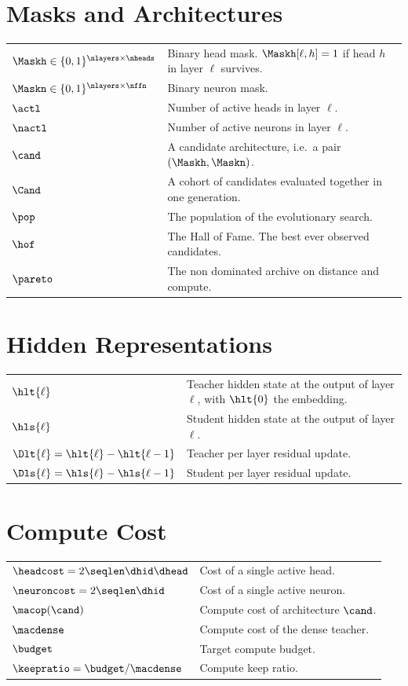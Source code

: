 \section*{Masks and Architectures}
\begin{tabular}{ll}
$\Maskh \in \{0,1\}^{\nlayers \times \nheads}$ & Binary head mask. $\Maskh[\ell, h] = 1$ if head $h$ in layer $\ell$ survives. \\
$\Maskn \in \{0,1\}^{\nlayers \times \nffn}$ & Binary neuron mask. \\
$\actl$ & Number of active heads in layer $\ell$. \\
$\nactl$ & Number of active neurons in layer $\ell$. \\
$\cand$ & A candidate architecture, i.e.\ a pair $(\Maskh, \Maskn)$. \\
$\Cand$ & A cohort of candidates evaluated together in one generation. \\
$\pop$ & The population of the evolutionary search. \\
$\hof$ & The Hall of Fame. The best ever observed candidates. \\
$\pareto$ & The non dominated archive on distance and compute. \\
\end{tabular}

\section*{Hidden Representations}
\begin{tabular}{ll}
$\hlt{\ell}$ & Teacher hidden state at the output of layer $\ell$, with $\hlt{0}$ the embedding. \\
$\hls{\ell}$ & Student hidden state at the output of layer $\ell$. \\
$\Dlt{\ell} = \hlt{\ell} - \hlt{\ell-1}$ & Teacher per layer residual update. \\
$\Dls{\ell} = \hls{\ell} - \hls{\ell-1}$ & Student per layer residual update. \\
\end{tabular}

\section*{Compute Cost}
\begin{tabular}{ll}
$\headcost = 2 \seqlen \dhid \dhead$ & Cost of a single active head. \\
$\neuroncost = 2 \seqlen \dhid$ & Cost of a single active neuron. \\
$\macop(\cand)$ & Compute cost of architecture $\cand$. \\
$\macdense$ & Compute cost of the dense teacher. \\
$\budget$ & Target compute budget. \\
$\keepratio = \budget / \macdense$ & Compute keep ratio. \\
\end{tabular}

